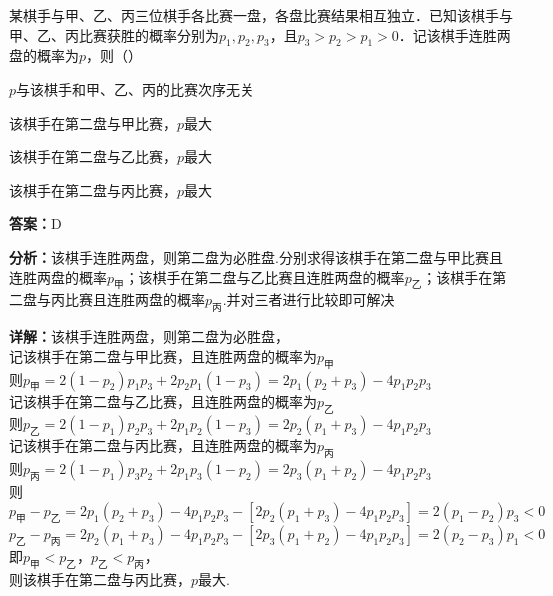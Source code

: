 \begin{question}[points=5]
某棋手与甲、乙、丙三位棋手各比赛一盘，各盘比赛结果相互独立．已知该棋手与甲、乙、丙比赛获胜的概率分别为$p_1, p_2, p_3$，且$p_3 > p_2 > p_1 > 0$．记该棋手连胜两盘的概率为$p$，则（\qquad）
\begin{choices}
  \item $p$与该棋手和甲、乙、丙的比赛次序无关
  \item 该棋手在第二盘与甲比赛，$p$最大
  \item 该棋手在第二盘与乙比赛，$p$最大
  \item 该棋手在第二盘与丙比赛，$p$最大
\end{choices}
\begin{solution}
\textbf{答案：}D

\textbf{分析：}该棋手连胜两盘，则第二盘为必胜盘.分别求得该棋手在第二盘与甲比赛且连胜两盘的概率$p_{\text{甲}}$；该棋手在第二盘与乙比赛且连胜两盘的概率$p_{\text{乙}}$；该棋手在第二盘与丙比赛且连胜两盘的概率$p_{\text{丙}}$.并对三者进行比较即可解决

\textbf{详解：}该棋手连胜两盘，则第二盘为必胜盘，\\记该棋手在第二盘与甲比赛，且连胜两盘的概率为$p_{\text{甲}}$\\则$p_{\text{甲}} = 2(1-p_2)p_1p_3 + 2p_2p_1(1-p_3) = 2p_1(p_2+p_3) - 4p_1p_2p_3$\\记该棋手在第二盘与乙比赛，且连胜两盘的概率为$p_{\text{乙}}$\\则$p_{\text{乙}} = 2(1-p_1)p_2p_3 + 2p_1p_2(1-p_3) = 2p_2(p_1+p_3) - 4p_1p_2p_3$\\记该棋手在第二盘与丙比赛，且连胜两盘的概率为$p_{\text{丙}}$\\则$p_{\text{丙}} = 2(1-p_1)p_3p_2 + 2p_1p_3(1-p_2) = 2p_3(p_1+p_2) - 4p_1p_2p_3$\\则$p_{\text{甲}} - p_{\text{乙}} = 2p_1(p_2+p_3) - 4p_1p_2p_3 - [2p_2(p_1+p_3) - 4p_1p_2p_3] = 2(p_1-p_2)p_3 < 0$\\$p_{\text{乙}} - p_{\text{丙}} = 2p_2(p_1+p_3) - 4p_1p_2p_3 - [2p_3(p_1+p_2) - 4p_1p_2p_3] = 2(p_2-p_3)p_1 < 0$\\即$p_{\text{甲}} < p_{\text{乙}}$，$p_{\text{乙}} < p_{\text{丙}}$，\\则该棋手在第二盘与丙比赛，$p$最大.
\end{solution}
\end{question}

